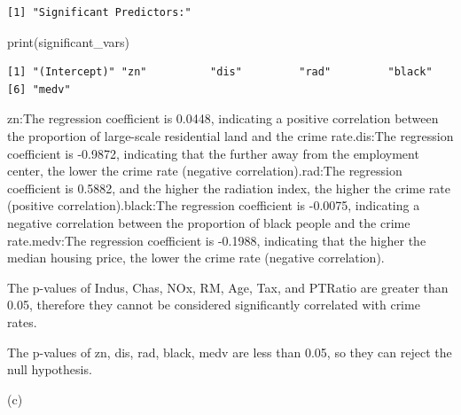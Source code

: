 \documentclass[
]{article}
\newenvironment{Shaded}{\begin{snugshade}}{\end{snugshade}}
\newcommand{\FunctionTok}[1]{\textcolor[rgb]{0.28,0.35,0.67}{#1}}
\newcommand{\NormalTok}[1]{\textcolor[rgb]{0.00,0.23,0.31}{#1}}
\begin{document}
\begin{verbatim}
[1] "Significant Predictors:"
\end{verbatim}

\begin{Shaded}
\begin{Highlighting}[]
\FunctionTok{print}\NormalTok{(significant\_vars)}
\end{Highlighting}
\end{Shaded}

\begin{verbatim}
[1] "(Intercept)" "zn"          "dis"         "rad"         "black"      
[6] "medv"       
\end{verbatim}

zn:The regression coefficient is 0.0448, indicating a positive
correlation between the proportion of large-scale residential land and
the crime rate.dis:The regression coefficient is -0.9872, indicating
that the further away from the employment center, the lower the crime
rate (negative correlation).rad:The regression coefficient is 0.5882,
and the higher the radiation index, the higher the crime rate (positive
correlation).black:The regression coefficient is -0.0075, indicating a
negative correlation between the proportion of black people and the
crime rate.medv:The regression coefficient is -0.1988, indicating that
the higher the median housing price, the lower the crime rate (negative
correlation).

The p-values of Indus, Chas, NOx, RM, Age, Tax, and PTRatio are greater
than 0.05, therefore they cannot be considered significantly correlated
with crime rates.

The p-values of zn, dis, rad, black, medv are less than 0.05, so they
can reject the null hypothesis.

(c)
\end{document}
